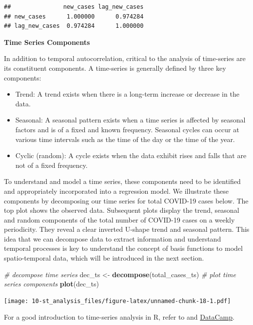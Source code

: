 \documentclass[
]{book}
\newenvironment{Shaded}{\begin{snugshade}}{\end{snugshade}}
\newcommand{\CommentTok}[1]{\textcolor[rgb]{0.56,0.35,0.01}{\textit{#1}}}
\newcommand{\KeywordTok}[1]{\textcolor[rgb]{0.13,0.29,0.53}{\textbf{#1}}}
\newcommand{\NormalTok}[1]{#1}
\newcommand{\StringTok}[1]{\textcolor[rgb]{0.31,0.60,0.02}{#1}}
\begin{document}
\begin{verbatim}
##               new_cases lag_new_cases
## new_cases      1.000000      0.974284
## lag_new_cases  0.974284      1.000000
\end{verbatim}

\textbf{Time Series Components}

In addition to temporal autocorrelation, critical to the analysis of time-series are its constituent components. A time-series is generally defined by three key components:

\begin{itemize}
\item
  Trend: A trend exists when there is a long-term increase or decrease in the data.
\item
  Seasonal: A seasonal pattern exists when a time series is affected by seasonal factors and is of a fixed and known frequency. Seasonal cycles can occur at various time intervals such as the time of the day or the time of the year.
\item
  Cyclic (random): A cycle exists when the data exhibit rises and falls that are not of a fixed frequency.
\end{itemize}

To understand and model a time series, these components need to be identified and appropriately incorporated into a regression model. We illustrate these components by decomposing our time series for total COVID-19 cases below. The top plot shows the observed data. Subsequent plots display the trend, seasonal and random components of the total number of COVID-19 cases on a weekly periodicity. They reveal a clear inverted U-shape trend and seasonal pattern. This idea that we can decompose data to extract information and understand temporal processes is key to understand the concept of basis functions to model spatio-temporal data, which will be introduced in the next section.

\begin{Shaded}
\begin{Highlighting}[]
\CommentTok{# decompose time series}
\NormalTok{dec_ts <-}\StringTok{ }\KeywordTok{decompose}\NormalTok{(total_cases_ts)}
\CommentTok{# plot time series components}
\KeywordTok{plot}\NormalTok{(dec_ts)}
\end{Highlighting}
\end{Shaded}

\texttt{[image: 10-st\_analysis\_files/figure-latex/unnamed-chunk-18-1.pdf]}

For a good introduction to time-series analysis in R, refer to \citet{hyndman2018forecasting} and \href{https://www.datacamp.com/courses/forecasting-using-r}{DataCamp}.
\end{document}
